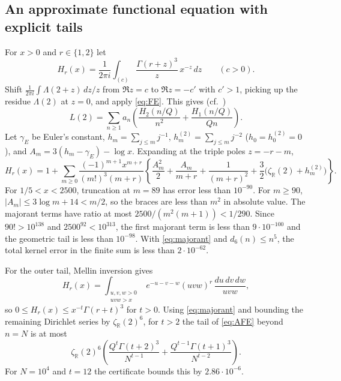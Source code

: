 \documentclass[11pt]{amsart}
\theoremstyle{remark}
\theoremstyle{definition}
\newcommand{\R}{\mathbb{R}}
\begin{document}
\subsection{An approximate functional equation with explicit tails}
For $x>0$ and $r\in\{1,2\}$ let
\[
H_r(x)=\frac{1}{2\pi i}\int_{(c)}\frac{\Gamma(r+z)^3}{z}\,x^{-z}\,dz\qquad(c>0).
\]
Shift $\frac{1}{2\pi i}\int\Lambda(2+z)\,dz/z$ from $\Re z=c$ to $\Re z=-c'$ with $c'>1$, picking up the residue $\Lambda(2)$ at $z=0$, and apply \eqref{eq:FE}. This gives (cf.~\cite{Dokchitser})
\begin{equation}\label{eq:AFE}
L(2)=\sum_{n\ge1}a_n\left(\frac{H_2(n/Q)}{n^2}+\frac{H_1(n/Q)}{Qn}\right).
\end{equation}
Let $\gamma_E$ be Euler's constant, $h_m=\sum_{j\le m}j^{-1}$, $h_m^{(2)}=\sum_{j\le m}j^{-2}$ ($h_0=h_0^{(2)}=0$), and $A_m=3(h_m-\gamma_E)-\log x$. Expanding at the triple poles $z=-r-m$,
\begin{equation}\label{eq:Hseries}
H_r(x)=1+\sum_{m\ge0}\frac{(-1)^{m+1}x^{m+r}}{(m!)^3(m+r)}\left\{\frac{A_m^2}{2}+\frac{A_m}{m+r}+\frac{1}{(m+r)^2}+\frac32\bigl(\zeta_\R(2)+h_m^{(2)}\bigr)\right\}.
\end{equation}
For $1/5<x<2500$, truncation at $m=89$ has error less than $10^{-90}$. For $m\ge90$, $|A_m|\le3\log m+14<m/2$, so the braces are less than $m^2$ in absolute value. The majorant terms have ratio at most $2500/(m^2(m+1))<1/290$. Since $90!>10^{138}$ and $2500^{92}<10^{313}$, the first majorant term is less than $9\cdot10^{-100}$ and the geometric tail is less than $10^{-98}$. With \eqref{eq:majorant} and $d_6(n)\le n^5$, the total kernel error in the finite sum is less than $2\cdot10^{-62}$.

For the outer tail, Mellin inversion gives
\[
H_r(x)=\int_{\substack{u,v,w>0\\ uvw>x}}e^{-u-v-w}(uvw)^{r}\,\frac{du\,dv\,dw}{uvw},
\]
so $0\le H_r(x)\le x^{-t}\Gamma(r+t)^3$ for $t>0$. Using \eqref{eq:majorant} and bounding the remaining Dirichlet series by $\zeta_\R(2)^6$, for $t>2$ the tail of \eqref{eq:AFE} beyond $n=N$ is at most
\begin{equation}\label{eq:tail}
\zeta_\R(2)^6\left(\frac{Q^t\Gamma(t+2)^3}{N^{t-1}}+\frac{Q^{t-1}\Gamma(t+1)^3}{N^{t-2}}\right).
\end{equation}
For $N=10^4$ and $t=12$ the certificate bounds this by $2.86\cdot10^{-6}$.
\end{document}
